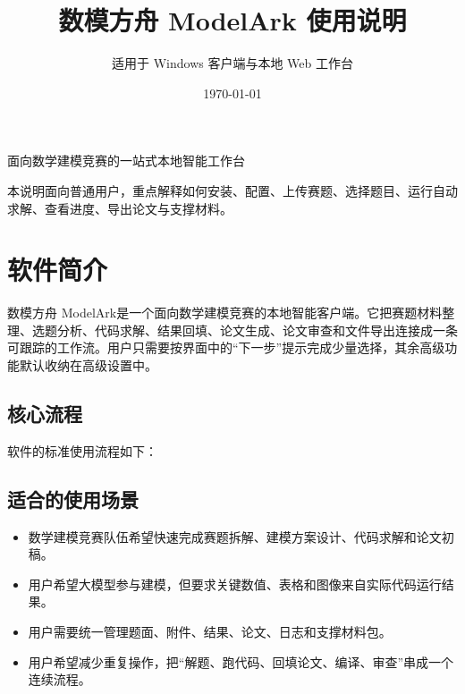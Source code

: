 \documentclass[UTF8,a4paper,12pt]{ctexart}
\title{\bfseries 数模方舟 ModelArk 使用说明}
\author{适用于 Windows 客户端与本地 Web 工作台}
\date{\today}
\newcommand{\app}{数模方舟 ModelArk}
\begin{document}
\maketitle
\thispagestyle{empty}

\begin{center}
  \vspace{1em}
  \large 面向数学建模竞赛的一站式本地智能工作台

  \vspace{1.5em}
  \normalsize
  本说明面向普通用户，重点解释如何安装、配置、上传赛题、选择题目、运行自动求解、查看进度、导出论文与支撑材料。
\end{center}

\newpage
\tableofcontents
\newpage

\section{软件简介}

\app 是一个面向数学建模竞赛的本地智能客户端。它把赛题材料整理、选题分析、代码求解、结果回填、论文生成、论文审查和文件导出连接成一条可跟踪的工作流。用户只需要按界面中的``下一步''提示完成少量选择，其余高级功能默认收纳在高级设置中。

\subsection{核心流程}

软件的标准使用流程如下：

\begin{center}
\end{center}

\subsection{适合的使用场景}

\begin{itemize}
  \item 数学建模竞赛队伍希望快速完成赛题拆解、建模方案设计、代码求解和论文初稿。
  \item 用户希望大模型参与建模，但要求关键数值、表格和图像来自实际代码运行结果。
  \item 用户需要统一管理题面、附件、结果、论文、日志和支撑材料包。
  \item 用户希望减少重复操作，把``解题、跑代码、回填论文、编译、审查''串成一个连续流程。
\end{itemize}
\end{document}
